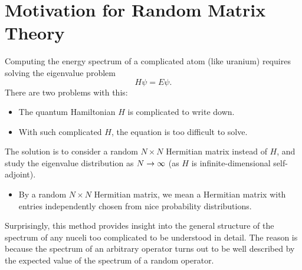 \section{Motivation for Random Matrix Theory}
Computing the energy spectrum of a complicated atom (like uranium) requires solving the eigenvalue problem
\[
    H\psi = E\psi.
\]
There are two problems with this:
\begin{itemize}
    \item The quantum Hamiltonian $H$ is complicated to write down.
    \item With such complicated $H$, the equation is too difficult to solve.
\end{itemize}

The solution is to consider a random $N \times N$ Hermitian matrix instead of $H$, and study the eigenvalue distribution as $N \to \infty$ (as $H$ is infinite-dimensional self-adjoint).
\begin{itemize}
    \item By a random $N \times N$ Hermitian matrix, we mean a Hermitian matrix with entries independently chosen from nice probability distributions.
\end{itemize}
Surprisingly, this method provides insight into the general structure of the spectrum of any nuceli too complicated to be understood in detail. The reason is because the spectrum of an arbitrary operator turns out to be well described by the expected value of the spectrum of a random operator.
